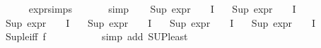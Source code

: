 \begin{isabellebody}
\ \ \ \ \isamarkupfalse%
\ expr{\isachardot}{\kern0pt}simps\ \isanewline
\ \ \ \ \isamarkupfalse%
\ simp{\isacharplus}{\kern0pt}\isanewline
\isanewline
\ \ \isamarkupfalse%
\ {\isachardoublequoteopen}Sup\ {\isacharparenleft}{\kern0pt}{\isacharparenleft}{\kern0pt}expr{\isacharunderscore}{\kern0pt}{}\ {\isasymcirc}\ {\isasymPhi}{\isacharparenright}{\kern0pt}\ {\isacharbackquote}{\kern0pt}\ I{\isacharparenright}{\kern0pt}\ {\isasymle}\ {}{\isachardoublequoteclose}\isanewline
{}\ {\isachardoublequoteopen}Sup\ {\isacharparenleft}{\kern0pt}{\isacharparenleft}{\kern0pt}expr{\isacharunderscore}{\kern0pt}{}\ {\isasymcirc}\ {\isasymPhi}{\isacharparenright}{\kern0pt}\ {\isacharbackquote}{\kern0pt}\ I{\isacharparenright}{\kern0pt}\ {\isasymle}\ {}{\isachardoublequoteclose}\isanewline
{}\ {\isachardoublequoteopen}Sup\ {\isacharparenleft}{\kern0pt}{\isacharparenleft}{\kern0pt}expr{\isacharunderscore}{\kern0pt}{}\ {\isasymcirc}\ {\isasymPhi}{\isacharparenright}{\kern0pt}\ {\isacharbackquote}{\kern0pt}\ I{\isacharparenright}{\kern0pt}\ {\isasymle}\ {}{\isachardoublequoteclose}\isanewline
{}\ {\isachardoublequoteopen}Sup\ {\isacharparenleft}{\kern0pt}{\isacharparenleft}{\kern0pt}expr{\isacharunderscore}{\kern0pt}{}\ {\isasymcirc}\ {\isasymPhi}{\isacharparenright}{\kern0pt}\ {\isacharbackquote}{\kern0pt}\ I{\isacharparenright}{\kern0pt}\ {\isasymle}\ {}{\isachardoublequoteclose}\isanewline
{}\ {\isachardoublequoteopen}Sup\ {\isacharparenleft}{\kern0pt}{\isacharparenleft}{\kern0pt}expr{\isacharunderscore}{\kern0pt}{}\ {\isasymcirc}\ {\isasymPhi}{\isacharparenright}{\kern0pt}\ {\isacharbackquote}{\kern0pt}\ I{\isacharparenright}{\kern0pt}\ {\isasymle}\ {}{\isachardoublequoteclose}\isanewline
{}\ {\isachardoublequoteopen}Sup\ {\isacharparenleft}{\kern0pt}{\isacharparenleft}{\kern0pt}expr{\isacharunderscore}{\kern0pt}{}\ {\isasymcirc}\ {\isasymPhi}{\isacharparenright}{\kern0pt}\ {\isacharbackquote}{\kern0pt}\ I{\isacharparenright}{\kern0pt}\ {\isasymle}\ {}{\isachardoublequoteclose}\isanewline
\ \ \ \ \isamarkupfalse%
\ Sup{\isacharunderscore}{\kern0pt}le{\isacharunderscore}{\kern0pt}iff\ f{}\isanewline
\ \ \ \ \ \ \ \ \ \isamarkupfalse%
\ {\isacharparenleft}{\kern0pt}simp\ add{\isacharcolon}{\kern0pt}\ SUP{\isacharunderscore}{\kern0pt}least{\isacharparenright}{\kern0pt}\isanewline

\end{isabellebody}
